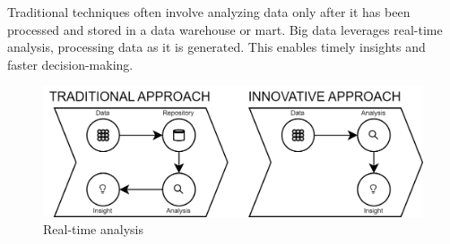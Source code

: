 \noindent Traditional techniques often involve analyzing data only after it has been processed and stored in a data warehouse or mart.
Big data leverages real-time analysis, processing data as it is generated. 
This enables timely insights and faster decision-making.
\begin{figure}[H]
    \centering
    \includegraphics[width=0.75\linewidth]{images/in3.png}
    \caption{Real-time analysis}
\end{figure}